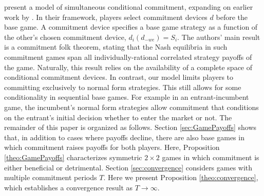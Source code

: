 \documentclass[../paper.tex]{subfiles}
\begin{document}
\textcite{kalai_commitment_2010} present a model of simultaneous conditional commitment, expanding on earlier work by \textcite{tennenholtz_program_2004}. In their framework, players select commitment devices $d$ before the base game. A commitment device specifies a base game strategy as a function of the other's chosen commitment device, $d_i(d_{-we})=S_i$. The authors' main result is a commitment folk theorem, stating that the Nash equilibria in such commitment games span all individually-rational correlated strategy payoffs of the game. Naturally, this result relies on the availability of a complete space of conditional commitment devices. In contrast, our model limits players to committing exclusively to normal form strategies. This still allows for some conditionality in sequential base games. For example in an entrant-incumbent game, the incumbent's normal form strategies allow commitment that conditions on the entrant’s initial decision whether to enter the market or not.
\newline
\newline
The remainder of this paper is organized as follows. Section \ref{sec:GamePayoffs} shows that, in addition to cases where payoffs decline, there are also base games in which commitment raises payoffs for both players. Here, Proposition \ref{theo:GamePayoffs} characterizes symmetric $2\times2$ games in which commitment is either beneficial or detrimental. Section \ref{sec:convergence} considers games with multiple commitment periods $T$. Here we present Proposition \ref{theo:convergence}, which establishes a convergence result as $T \to \infty$.
\end{document}
